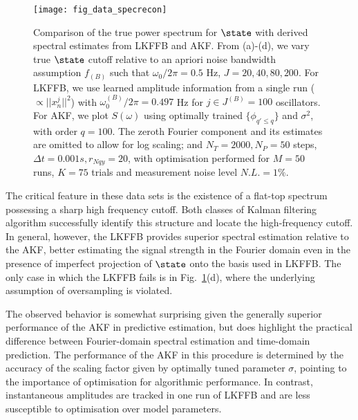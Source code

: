{\begin{figure}[tp]
    \texttt{[image: fig\_data\_specrecon]}
    \caption{\label{fig:main:fig_data_specrecon} Comparison of the true power spectrum for $\state$ with derived spectral estimates from LKFFB and AKF. From (a)-(d), we vary true $\state$ cutoff relative to an apriori noise bandwidth assumption $f_{(B)}$ such that $\omega_0 / 2\pi = 0.5$ Hz, $J = 20, 40, 80, 200$. For LKFFB, we use learned amplitude information from a single run ($\propto ||x^j_n||^2 $) with $\omega_0^{(B)} / 2\pi = 0.497$ Hz for $j \in J^{(B)} = 100$ oscillators. For AKF, we plot $S(\omega)$ using optimally trained $\{\phi_{q' \leq q}\}$ and $\sigma^2$, with order $q = 100$. The zeroth Fourier component and its estimates are omitted to allow for log scaling; and $N_T = 2000, N_P = 50$ steps, $\Delta t = 0.001s, r_{Nqy}=20$, with optimisation performed for $M=50$ runs, $K=75$ trials and measurement noise level $N.L. = 1\%$.} 
\end{figure} 

The critical feature in these data sets is the existence of a flat-top spectrum possessing a sharp high frequency cutoff.  Both classes of Kalman filtering algorithm successfully identify this structure and locate the high-frequency cutoff.  In general, however, the LKFFB provides superior spectral estimation relative to the AKF, better estimating the signal strength in the Fourier domain even in the presence of imperfect projection of $\state$ onto the basis used in LKFFB.  The only case in which the LKFFB fails is in Fig.~\ref{fig:main:fig_data_specrecon}(d), where the underlying assumption of oversampling is violated.  

The observed behavior is somewhat surprising given the generally superior performance of the AKF in predictive estimation, but does highlight the practical difference between Fourier-domain spectral estimation and time-domain prediction.  The performance of the AKF in this procedure is determined by the accuracy of the scaling factor given by optimally tuned parameter $\sigma$, pointing to the importance of optimisation for algorithmic performance. In contrast, instantaneous amplitudes are tracked in one run of LKFFB and are less susceptible to optimisation over model parameters.


\newpage
}
